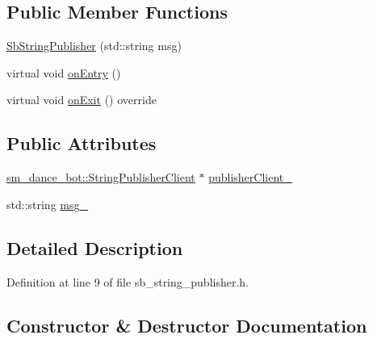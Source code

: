 \subsection*{Public Member Functions}
\begin{DoxyCompactItemize}
\item 
\hyperlink{classsm__dance__bot_1_1SbStringPublisher_a583ac39c6d2c89669c5871759da9b531}{Sb\+String\+Publisher} (std\+::string msg)
\item 
virtual void \hyperlink{classsm__dance__bot_1_1SbStringPublisher_abe2ccdc541a0bcb62be3e5f9a805e6f1}{on\+Entry} ()
\item 
virtual void \hyperlink{classsm__dance__bot_1_1SbStringPublisher_ac98b1befbcf67d2e7c175faec5fcd2d5}{on\+Exit} () override
\end{DoxyCompactItemize}
\subsection*{Public Attributes}
\begin{DoxyCompactItemize}
\item 
\hyperlink{classsm__dance__bot_1_1StringPublisherClient}{sm\+\_\+dance\+\_\+bot\+::\+String\+Publisher\+Client} $\ast$ \hyperlink{classsm__dance__bot_1_1SbStringPublisher_ab24c4e17860a4a329df0ccc835486cbe}{publisher\+Client\+\_\+}
\item 
std\+::string \hyperlink{classsm__dance__bot_1_1SbStringPublisher_ad2ed2eadf87a57cce9c8fd4bc80bb8d3}{msg\+\_\+}
\end{DoxyCompactItemize}


\subsection{Detailed Description}


Definition at line 9 of file sb\+\_\+string\+\_\+publisher.\+h.



\subsection{Constructor \& Destructor Documentation}
